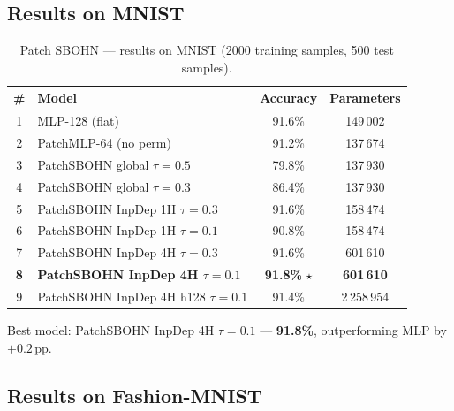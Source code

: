 \documentclass[11pt,a4paper]{report}
\begin{document}
\subsection{Results on MNIST}

\begin{table}[h]
\centering
\caption{Patch SBOHN --- results on MNIST (2000 training samples, 500 test samples).}
\begin{tabular}{clcc}
\hline
\# & \textbf{Model} & \textbf{Accuracy} & \textbf{Parameters} \\
\hline
1 & MLP-128 (flat) & 91.6\% & 149\,002 \\
2 & PatchMLP-64 (no perm) & 91.2\% & 137\,674 \\
3 & PatchSBOHN global $\tau{=}0.5$ & 79.8\% & 137\,930 \\
4 & PatchSBOHN global $\tau{=}0.3$ & 86.4\% & 137\,930 \\
5 & PatchSBOHN InpDep 1H $\tau{=}0.3$ & 91.6\% & 158\,474 \\
6 & PatchSBOHN InpDep 1H $\tau{=}0.1$ & 90.8\% & 158\,474 \\
7 & PatchSBOHN InpDep 4H $\tau{=}0.3$ & 91.6\% & 601\,610 \\
\textbf{8} & \textbf{PatchSBOHN InpDep 4H $\tau{=}0.1$} & \textbf{91.8\%} $\star$ & \textbf{601\,610} \\
9 & PatchSBOHN InpDep 4H h128 $\tau{=}0.1$ & 91.4\% & 2\,258\,954 \\
\hline
\end{tabular}
\end{table}

Best model: PatchSBOHN InpDep 4H $\tau{=}0.1$ --- \textbf{91.8\%}, outperforming MLP by $+0.2$\,pp.

\subsection{Results on Fashion-MNIST}
\end{document}
